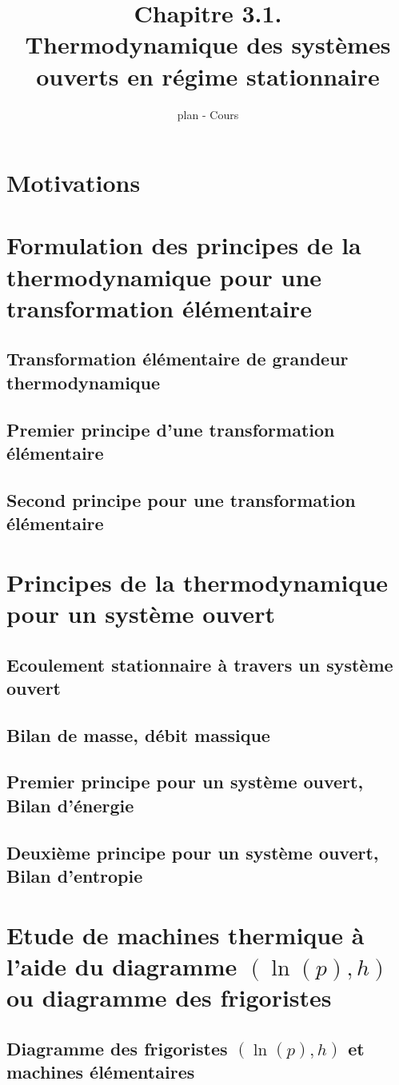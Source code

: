 \documentclass[french]{article}
\begin{document}
	
\title{Chapitre 3.1. \\
Thermodynamique des systèmes ouverts en régime stationnaire}
\author{plan - Cours}
\date{}
	
\maketitle

\section*{Motivations}

\section{Formulation des principes de la thermodynamique pour une transformation élémentaire}

\subsection{Transformation élémentaire de grandeur thermodynamique}

\subsection{Premier principe d'une transformation élémentaire}

\subsection{Second principe pour une transformation élémentaire}

\section{Principes de la thermodynamique pour un système ouvert}

\subsection{Ecoulement stationnaire à travers un système ouvert}

\subsection{Bilan de masse, débit massique}

\subsection{Premier principe pour un système ouvert, Bilan d'énergie}

\subsection{Deuxième principe pour un système ouvert, Bilan d'entropie}

\section{Etude de machines thermique à l'aide du diagramme $(\ln(p), h)$ ou diagramme des frigoristes}

\subsection{Diagramme des frigoristes $(\ln(p),h)$ et machines élémentaires}
\end{document}
